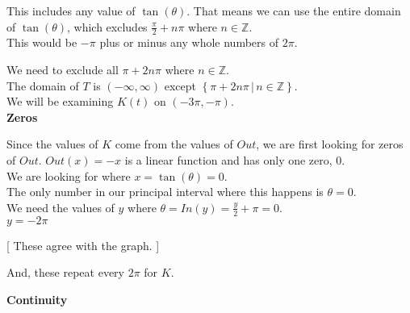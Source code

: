 \documentclass{ximera}
\begin{document}
This includes any value of $\tan(\theta)$. That means we can use the entire domain of $\tan(\theta)$, which excludes $\frac{\pi}{2} + n \pi$ where $n \in \mathbb{Z}$. \\


This would be $-\pi$ plus or minus any whole numbers of $2\pi$.

We need to exclude  all $\pi + 2n\pi$ where $n \in \mathbb{Z}$. \\




The domain of $T$ is $(-\infty, \infty)$ except $\left\{  \pi + 2n\pi \, | \,   n \in \mathbb{Z}  \right\}$. \\




We will be examining $K(t)$ on $(-3\pi, -\pi)$. \\














\textbf{\textcolor{blue!55!black}{Zeros}}


Since the values of $K$ come from the values of $Out$, we are first looking for zeros of $Out$.  $Out(x) = -x$ is a linear function and has only one zero, $0$. \\

We are looking for where $x = \tan(\theta) = 0$. \\


The only number in our principal interval where this happens is $\theta = 0$. \\



We need the values of $y$ where $\theta = In(y) = \frac{y}{2} + \pi = 0$. \\


$y = -2\pi$  

[ These agree with the graph. ]


And, these repeat every $2\pi$ for $K$.




















\textbf{\textcolor{blue!55!black}{Continuity}}
\end{document}
